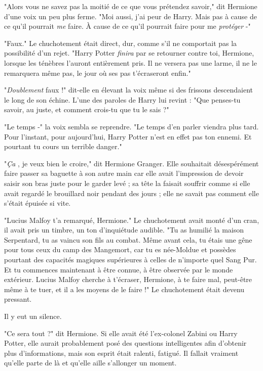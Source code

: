 "Alors vous ne savez pas la moitié de ce que vous prétendez savoir," dit Hermione d'une voix un peu plus ferme. "Moi aussi, j'ai peur de Harry. Mais pas à cause de ce qu'il pourrait \emph{me}  faire. À cause de ce qu'il pourrait faire pour me \emph{protéger}  -"

"Faux." Le chuchotement était direct, dur, comme s'il ne comportait pas la possibilité d'un rejet. "Harry Potter \emph{finira } par se retourner contre toi, Hermione, lorsque les ténèbres l'auront entièrement pris. Il ne versera pas une larme, il ne le remarquera même pas, le jour où ses pas t'écraseront enfin."

"\emph{Doublement}  faux !" dit-elle en élevant la voix même si des frissons descendaient le long de son échine. L'une des paroles de Harry lui revint : "Que penses-tu savoir, au juste, et comment crois-tu que tu le sais ?"

"Le temps -" la voix sembla se reprendre. "Le temps d'en parler viendra plus tard. Pour l'instant, pour aujourd'hui, Harry Potter n'est en effet pas ton ennemi. Et pourtant tu cours un terrible danger."

"\emph{Ça} , je veux bien le croire," dit Hermione Granger. Elle souhaitait désespérément faire passer sa baguette à son autre main car elle avait l'impression de devoir saisir son bras juste pour le garder levé ; sa tête la faisait souffrir comme si elle avait regardé le brouillard noir pendant des jours ; elle ne savait pas comment elle s'était épuisée si vite.

"Lucius Malfoy t'a remarqué, Hermione." Le chuchotement avait monté d'un cran, il avait pris un timbre, un ton d'inquiétude audible. "Tu as humilié la maison Serpentard, tu as vaincu son fils au combat. Même avant cela, tu étais une gêne pour tous ceux du camp des Mangemort, car tu es née-Moldue et possèdes pourtant des capacités magiques supérieures à celles de n'importe quel Sang Pur. Et tu commences maintenant à être connue, à être observée par le monde extérieur. Lucius Malfoy cherche à t'écraser, Hermione, à te faire mal, peut-être même à te tuer, et il a les moyens de le faire !" Le chuchotement était devenu pressant.

Il y eut un silence.

"Ce sera tout ?" dit Hermione. Si elle avait été l'ex-colonel Zabini ou Harry Potter, elle aurait probablement posé des questions intelligentes afin d'obtenir plus d'informations, mais son esprit était ralenti, fatigué. Il fallait vraiment qu'elle parte de là et qu'elle aille s'allonger un moment.

